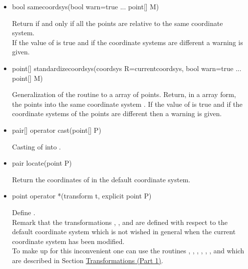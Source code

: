 \documentclass[pdftex]{article}
\begin{document}
\begin{itemize}
\item {}
  \begin{Vcolor}
    bool samecoordsys(bool warn=true ... point[] M)
  \end{Vcolor}
  Return  if and only if all the points are relative to the
  same coordinate system.\\
  If the value of  is true and if the coordinate systems are
  different a warning is given.
\item {}
  \begin{Vcolor}
    point[] standardizecoordsys(coordsys R=currentcoordsys,
    bool warn=true ... point[] M)
  \end{Vcolor}
  Generalization of the routine  to a array of
  points. Return, in a array form,  the points into the same
  coordinate system . If the value of  is true and if the
  coordinate systems of the points are different then a warning is given.
\item
  \begin{Vcolor}
    pair[] operator cast(point[] P)
  \end{Vcolor}
  Casting of  into .
\item {}
  \begin{Vcolor}
    pair locate(point P)
  \end{Vcolor}
  Return the coordinates of  in the default coordinate system.
\item {}
  \begin{Vcolor}
    point operator *(transform t, explicit point P)
  \end{Vcolor}
  Define .\\
  Remark that the transformations  , ,
   and  are defined with respect to the
  default coordinate system which is not wished in general when the current
  coordinate system has been modified.\\
  To make up for this inconvenient one can use the routines
  , ,
  ,   ,
  ,   ,  and
   which are described in Section \href{section.transform1}{Transformations (Part 1)}.

\end{itemize}
\end{document}
